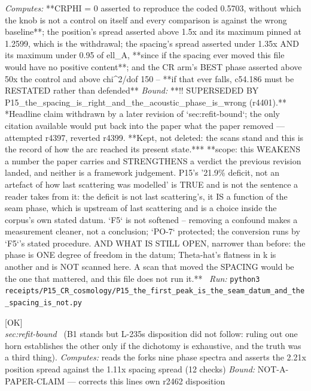 \begin{description}
\emph{Computes:} **CRPHI = 0 asserted to reproduce the coded 0.5703, without which the knob is not a control on itself and every comparison is against the wrong baseline**; the position's spread asserted above 1.5x and its maximum pinned at 1.2599, which is the withdrawal; the spacing's spread asserted under 1.35x AND its maximum under 0.95 of ell\_A, **since if the spacing ever moved this file would have no positive content**; and the CR arm's BEST phase asserted above 50x the control and above chi\textasciicircum{}2/dof 150 -- **if that ever falls, c54.186 must be RESTATED rather than defended**
 \emph{Bound:} **!! SUPERSEDED BY P15\_the\_spacing\_is\_right\_and\_the\_acoustic\_phase\_is\_wrong (r4401).** *Headline claim withdrawn by a later revision of `sec:refit-bound`; the only citation available would put back into the paper what the paper removed --- attempted r4397, reverted r4399. **Kept, not deleted: the scans stand and this is the record of how the arc reached its present state.*** **scope: this WEAKENS a number the paper carries and STRENGTHENS a verdict the previous revision landed, and neither is a framework judgement. P15's '21.9\% deficit, not an artefact of how last scattering was modelled' is TRUE and is not the sentence a reader takes from it: the deficit is not last scattering's, it IS a function of the seam phase, which is upstream of last scattering and is a choice inside the corpus's own stated datum. `F5` is not softened -- removing a confound makes a measurement cleaner, not a conclusion; `PO-7` protected; the conversion runs by `F5`'s stated procedure. AND WHAT IS STILL OPEN, narrower than before: the phase is ONE degree of freedom in the datum; Theta-hat's flatness in k is another and is NOT scanned here. A scan that moved the SPACING would be the one that mattered, and this file does not run it.**
\ \emph{Run:} \texttt{python3 receipts/P15\_CR\_cosmology/P15\_the\_first\_peak\_is\_the\_seam\_datum\_and\_the\_spacing\_is\_not.py}
\item[\label{rcpt:B3_a_dichotomy_stated_is_not_a_dichotomy_proved}\textbf{}\quad\texttt{B3\_a\_dichotomy\_stated\_is\_not\_a\_dichotomy\_proved}]\hfill\textsf{[OK]}\\
\textit{sec:refit-bound} \ (B1 stands but L-235s disposition did not follow: ruling out one horn establishes the other only if the dichotomy is exhaustive, and the truth was a third thing). 
\emph{Computes:} reads the forks nine phase spectra and asserts the 2.21x position spread against the 1.11x spacing spread (12 checks)
 \emph{Bound:} NOT-A-PAPER-CLAIM --- corrects this lines own r2462 disposition

\end{description}
